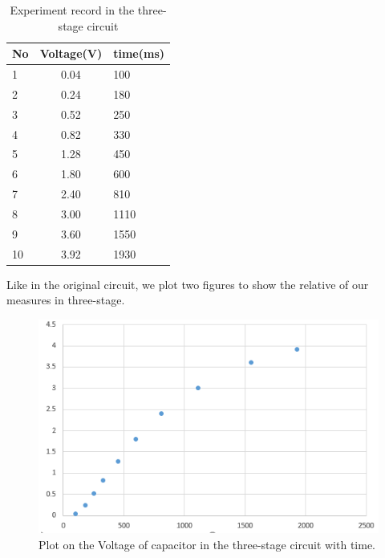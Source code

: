 \begin{table}[!htbp]\centering
	\caption{Experiment record in the three-stage circuit}
	\renewcommand\arraystretch{1.5}
	\begin{tabular}{lcl}
		\toprule
		No		&Voltage(V)	&time(ms)	\\
		\midrule
		1		&0.04		&100		\\
		
		2		&0.24		&180		\\
		
		3		&0.52		&250		\\
		
		4		&0.82		&330		\\
		
		5		&1.28		&450		\\
		
		6		&1.80		&600		\\
		
		7		&2.40		&810		\\
		
		8		&3.00		&1110		\\
		
		9		&3.60		&1550		\\
		
		10		&3.92		&1930		\\
		\bottomrule
	\end{tabular}
\end{table}
\phantom{ } Like in the original circuit, we plot two figures to show the relative of our measures in three-stage.
\begin{figure}[!htbp]
	\centering %
	\includegraphics[width=\linewidth]{images/2_7.PNG} %
	\caption{Plot on the Voltage of capacitor in the three-stage circuit with time.} %
	\label{fig:2.7} %
\end{figure}

